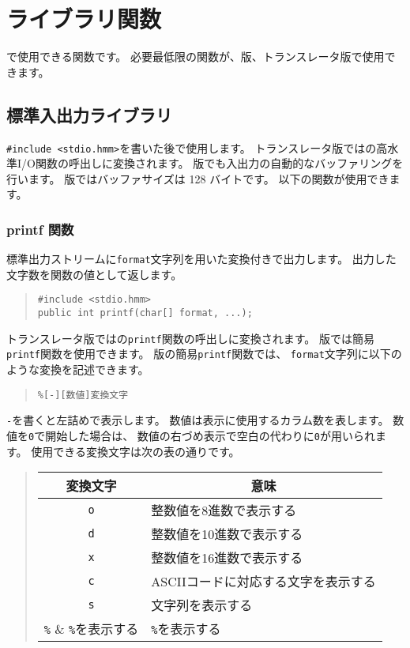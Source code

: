 % 
%
\chapter{ライブラリ関数}

\cmml で使用できる関数です。
必要最低限の関数が、\tac 版、\cl トランスレータ版で使用できます。

\section{標準入出力ライブラリ}
\label{chap4:stdio}

\verb/#include <stdio.hmm>/を書いた後で使用します。
トランスレータ版では\cl の高水準I/O関数の呼出しに変換されます。
\tac 版でも入出力の自動的なバッファリングを行います。
\tac 版ではバッファサイズは 128 バイトです。
以下の関数が使用できます。

\subsection{printf 関数}

標準出力ストリームに\verb/format/文字列を用いた変換付きで出力します。
出力した文字数を関数の値として返します。

\begin{quote}
\begin{verbatim}
#include <stdio.hmm>
public int printf(char[] format, ...);
\end{verbatim}
\end{quote}

トランスレータ版では\cl の\verb/printf/関数の呼出しに変換されます。
\tac 版では簡易\verb/printf/関数を使用できます。
\tac 版の簡易\verb/printf/関数では、
\verb/format/文字列に以下のような変換を記述できます。

\begin{quote}
\begin{verbatim}
%[-][数値]変換文字
\end{verbatim}
\end{quote}

\verb/-/を書くと左詰めで表示します。
数値は表示に使用するカラム数を表します。
数値を\verb/0/で開始した場合は、
数値の右づめ表示で空白の代わりに\verb/0/が用いられます。
使用できる変換文字は次の表の通りです。

\begin{quote}
\begin{tabular}{c|l}
\multicolumn{1}{c|}{変換文字} & \multicolumn{1}{c}{意味} \\\hline
\verb/o/ & 整数値を8進数で表示する \\
\verb/d/ & 整数値を10進数で表示する \\
\verb/x/ & 整数値を16進数で表示する \\
\verb/c/ & ASCIIコードに対応する文字を表示する \\
\verb/s/ & 文字列を表示する \\
\verb/%/ & \verb/%/を表示する \\
\end{tabular}
\end{quote}

